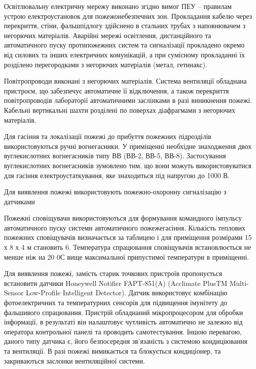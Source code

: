 \documentclass[ukrainian,utf8,simple,floatsubsection, hpadding=5mm,equationsubsection,]{eskdtext}
\begin{document}
Освітлювальну електричну мережу виконано згідно вимог ПЕУ – правилам устрою електроустановок для пожежонебезпечних зон.
Прокладання кабелю через перекриття, стіни, фальшпідлогу здійснено в стальних трубах з наповнювачем з негорючих матеріалів.
Аварійні мережі освітлення, дистанційного та автоматичного пуску протипожежних систем та сигналізації 
прокладено окремо від силових та інших електричних комунікацій, а при сумісному прокладанні їх 
розділено перегородками з негорючих матеріалів (метал, гетинакс).



Повітропроводи виконані з негорючих матеріалів. Система вентиляції обладнана пристроєм, що 
забезпечує автоматичне її відключення, а також перекриття повітропроводів лабораторії 
автоматичними заслінками в разі виникнення пожежі. Кабельні вертикальні шахти розділені 
по поверхах діафрагмами з негорючих матеріалів.

Для гасіння та локалізації пожежі до прибуття пожежних підрозділів використовуються 
ручні вогнегасники.  У приміщенні необхідне знаходження двох вуглекислотних вогнегасників 
типу ВВ (ВВ-2, ВВ-5, ВВ-8). Застосування вуглекислотних вогнегасників зумовлено тим, що 
вони можуть використовуватися для гасіння електроустаткування, яке знаходиться під напругою до 1000 В. 

Для виявлення пожежі використовують пожежно-охоронну сигналізацію з датчиками 

Пожежні сповіщувачи використовуються для формування командного імпульсу автоматичного 
пуску системи автоматичного пожежегасіння. Кількість теплових пожежних сповіщувачів 
визначається за таблицею і для приміщення розмірами 15 х 8 х 4 м становить 6. 
Температура спрацювання сповіщувачів встановлюється не менше ніж на 20 0С вище 
максимальної припустимої температури в приміщенні.

Для виявлення пожежі, замість старик точкових пристроїв пропонується
встановити датчики Honeywell Notifier FAPT-851(A)
(Acclimate PlusTM Multi-Sensor Low-Profile Intelligent Detector). Датчик 
використовує комбінацію фотоелектричних та температурних сенсорів для
підвищення імунітету до фальшивого спрацювання. Пристрій обладнаний мікропроцесором
для обробки інформації, в результаті він налаштовує чутливість автоматично
не залежно від оператора контрольної панелі та проводить самотестування.
Іншою перевагою, даного типу датчика є, його безпосередня зв'язаність з системою
кондиціювання та вентиляції. В разі пожежі вимикається та блокується кондиціонер,
та закриваються заслонки вентиляційної системи.
\end{document}
